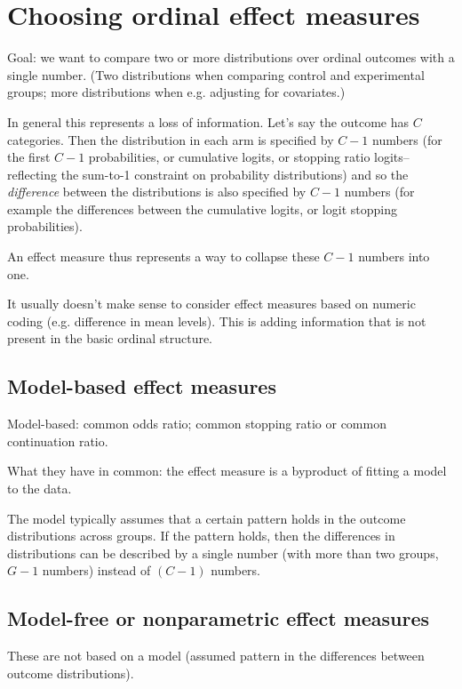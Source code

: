 \documentclass[
  11pt,
  fleqn
]{article}
\begin{document}
\section{Choosing ordinal effect measures}

Goal: we want to compare two or more distributions over ordinal
outcomes with a single number. (Two distributions when comparing control and
experimental groups; more distributions when e.g. adjusting for covariates.)

In general this represents a loss of information. Let's say the
outcome has $C$ categories. Then the distribution in each
arm is specified by $C-1$ numbers (for the first $C-1$ probabilities,
  or cumulative logits, or stopping ratio logits--reflecting the
sum-to-1 constraint on probability distributions) and so the
\emph{difference} between the distributions is also specified by
$C-1$ numbers (for example the differences between the cumulative
logits, or logit stopping probabilities).

An effect measure thus represents a way to collapse these $C-1$
numbers into one.

It usually doesn't make sense to consider effect measures based on
numeric coding (e.g. difference in mean levels). This is adding
information that is not present in the basic ordinal structure.

\subsection{Model-based effect measures}

Model-based: common odds ratio; common stopping ratio or common continuation
ratio.

What they have in common: the effect measure is a byproduct of fitting a model
to the data.

The model typically assumes that a certain pattern holds in the outcome
distributions across groups. If the pattern holds, then the differences in
distributions can be described by a single number (with more than two groups,
$G-1$ numbers) instead of $(C-1)$ numbers.

\subsection{Model-free or nonparametric effect measures}

These are not based on a model (assumed pattern in the differences
between outcome distributions).
\end{document}
